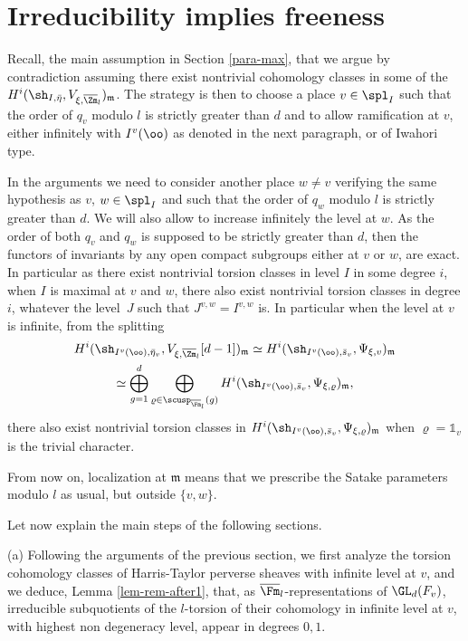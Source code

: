 \section{Irreducibility implies freeness}
\label{para-proof}

Recall, \cf the main assumption in Section \ref{para-max},
that we argue by contradiction assuming there exist nontrivial
cohomology classes in some of the
$H^i(\sh_{I,\bar \eta},V_{\xi,\overline \Zm_l})_{\mathfrak m}$.
The strategy is then to choose a place $v \in \spl_I$ such that the order of $q_v$
modulo $l$ is strictly greater than $d$ and to allow ramification at $v$, either infinitely
with $I^v(\oo)$ as denoted in the next paragraph, or
of Iwahori type.

In the arguments we need to consider another place $w \neq v$
verifying the same hypothesis as $v$, \ie $w \in \spl_I$ and such that the order of
$q_w$ modulo $l$ is strictly greater than $d$. We will also allow to
increase infinitely the level at $w$. As the order of both $q_v$ and
$q_w$ is supposed to be strictly greater than $d$, then the functors of invariants
by any open compact subgroups either at $v$ or $w$, are exact. In particular
as there exist nontrivial torsion classes in level $I$ in some degree $i$, when
$I$ is maximal at $v$ and
$w$, there also exist nontrivial torsion classes in degree $i$, whatever the
level~$J$ such that $J^{v,w} = I^{v,w}$ is.
In particular when the level at $v$ is infinite, from the splitting
\begin{multline*}
H^i(\sh_{I^v(\oo),\bar \eta_v},V_{\xi,\overline \Zm_l}[d-1])_{\mathfrak m} \simeq
H^i(\sh_{I^v(\oo),\bar s_v},\Psi_{\xi,v})_{\mathfrak m} \\
\simeq \bigoplus_{g=1}^d
\bigoplus_{\varrho \in \scusp_{\overline \Fm_l}(g)} H^i(\sh_{I^v(\oo),\bar s_v},
\Psi_{\xi,\varrho})_{\mathfrak m},
\end{multline*}
there also exist nontrivial torsion classes
in $H^i(\sh_{I^v(\oo),\bar s_v},\Psi_{\xi,\varrho})_{\mathfrak m}$
when $\varrho=\mathds 1_v$ is the trivial character.

\begin{remark}
From now on, localization at $\mathfrak m$ means that we prescribe
the Satake parameters modulo $l$ as usual, but outside $\{v,w\}$.
\end{remark}

Let now explain the main steps of the following sections.

(a) Following the arguments of the previous section,
we first analyze the torsion cohomology
classes of Harris-Taylor perverse sheaves with infinite level at $v$, and we deduce,
\cf Lemma \ref{lem-rem-after1}, that, as $\overline \Fm_l$-representations
of $\GL_d(F_v)$,
irreducible subquotients of the $l$-torsion
of their cohomology in infinite level at $v$, with highest non degeneracy level, appear in degrees $0,1$.

